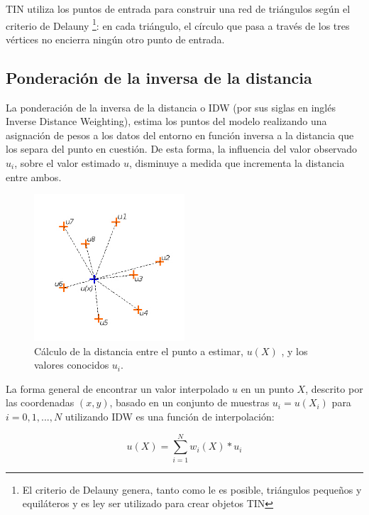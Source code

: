 TIN utiliza los puntos de entrada para construir una red de triángulos según el criterio de Delauny
\footnote{El criterio de Delauny genera, tanto como le es posible, triángulos pequeños y
equiláteros y es ley ser utilizado para crear objetos TIN}: en cada triángulo, el círculo que pasa
a través de los tres vértices no encierra ningún otro punto de entrada\cite{cPachecoMDE2003}.

\subsection{Ponderación de la inversa de la distancia}
La ponderación de la inversa de la distancia o IDW (por sus siglas en inglés Inverse Distance
Weighting), estima los puntos del modelo realizando una asignación de pesos a los datos del
entorno en función inversa a la distancia que los separa del punto en cuestión. De esta forma,
la influencia del valor observado $u_{i}$, sobre el valor estimado $u$, disminuye a medida que
incrementa la distancia entre ambos.


\begin{figure}[!htbp]
\centering
\includegraphics[width=0.5\textwidth]{capitulo-2/graphics/idw-distancia.jpg}
\caption{\label{fig:sig-idw-distancia} Cálculo de la distancia entre el punto a estimar, $u(X)$ , y los valores conocidos $u_{i}$.}

\end{figure}

La forma general de encontrar un valor interpolado $u$ en un punto $X$, descrito por las coordenadas $(x, y)$, basado en un conjunto de muestras $u_i = u (X_i)$ para $i = 0,1, ..., N$ utilizando IDW es una función de interpolación:

\begin{equation}\label{eq:interpolacion-idw}
 u(X) = \sum_{i=1}^{N} w_i(X) * u_{i}
\end{equation}

